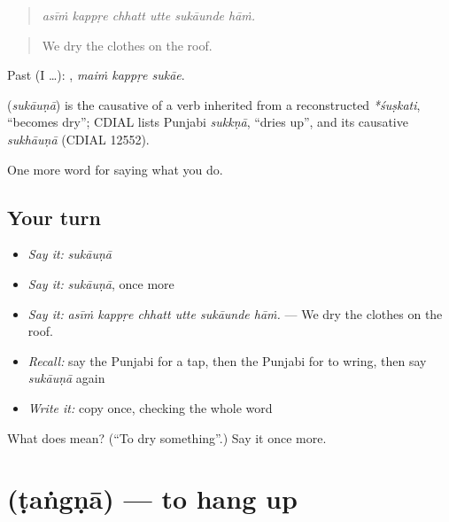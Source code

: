 \begin{quote}
     
\end{quote}

\begin{quote}
\emph{asīṁ kappṛe chhatt utte sukāunde hāṁ.}
\end{quote}

\begin{quote}
We dry the clothes on the roof.
\end{quote}

Past (I …):   , \emph{maiṁ kappṛe sukāe}.

\begin{cousinweb}
\textbf{} (\emph{sukāuṇā}) is the causative of a verb inherited from a reconstructed \emph{*śuṣkati}, \textquotedblleft{}becomes dry\textquotedblright{}; CDIAL lists Punjabi \emph{sukkṇā}, \textquotedblleft{}dries up\textquotedblright{}, and its causative \emph{sukhāuṇā} (CDIAL 12552).
\end{cousinweb}

\begin{grammarlens}[title={What you've built}]
One more word for saying what you do.
\end{grammarlens}

\subsection*{Your turn}
\begin{itemize}
\raggedright
  \item \emph{Say it:} \emph{sukāuṇā}
  \item \emph{Say it:} \emph{sukāuṇā}, once more
  \item \emph{Say it:} \emph{asīṁ kappṛe chhatt utte sukāunde hāṁ.} — We dry the clothes on the roof.
  \item \emph{Recall:} say the Punjabi for a tap, then the Punjabi for to wring, then say \emph{sukāuṇā} again
  \item \emph{Write it:} copy \textbf{} once, checking the whole word
\end{itemize}

\begin{tcolorbox}[breakable,colback=teal!4,colframe=teal!35!black,title={Before you move on}]
What does  mean? (\textquotedblleft{}To dry something\textquotedblright{}.) Say it once more.
\end{tcolorbox}
\section[\texorpdfstring{\pa{ਟੰਗਣਾ} (ṭaṅgṇā)}{ਟੰਗਣਾ (ṭaṅgṇā)}]{ (ṭaṅgṇā) — to hang up}

